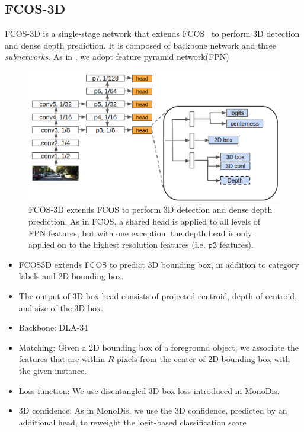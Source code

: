 \subsection{FCOS-3D}
FCOS-3D is a single-stage network that extends FCOS~\cite{tian2019fcos} to perform 3D detection and dense depth prediction. It is composed of backbone network and three \emph{subnetworks}. As in \cite{tian2019fcos}, we adopt feature pyramid network(FPN)~\cite{} 
\begin{figure}[h]
	\centering
	\includegraphics[width=1.0\columnwidth]{figures/fcos3d_arch.png}
	\caption{FCOS-3D extends FCOS to perform 3D detection and dense depth prediction. As in FCOS, a shared head is applied to all levels of FPN features, but with one exception: the depth head is only applied on to the highest resolution features (i.e. $\texttt{p3}$ features).}
\end{figure}

\begin{itemize}
    \item FCOS3D extends FCOS to predict 3D bounding box, in addition to category labels and 2D bounding box.
    \item The output of 3D box head consists of projected centroid, depth of centroid, and size of the 3D box.
    \item Backbone: DLA-34
    \item Matching: Given a 2D bounding box of a foreground object, we associate the features that are within $R$ pixels from the center of 2D bounding box with the given instance.
    \item Loss function: We use disentangled 3D box loss introduced in MonoDis.
    \item 3D confidence: As in MonoDis, we use the 3D confidence, predicted by an additional head, to reweight the logit-based classification score
\end{itemize}

